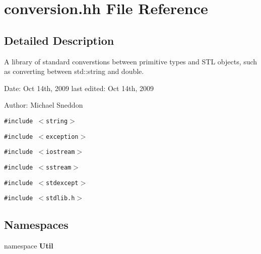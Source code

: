 \section{conversion.hh File Reference}
\label{conversion_8hh}


\subsection{Detailed Description}
A library of standard converstions between primitive types and STL objects, such as converting between std::string and double.

\begin{Desc}
\item[Date:]Oct 14th, 2009 last edited: Oct 14th, 2009\end{Desc}
\begin{Desc}
\item[Author:]Michael Sneddon \end{Desc}


{\tt \#include $<$string$>$}\par
{\tt \#include $<$exception$>$}\par
{\tt \#include $<$iostream$>$}\par
{\tt \#include $<$sstream$>$}\par
{\tt \#include $<$stdexcept$>$}\par
{\tt \#include $<$stdlib.h$>$}\par
\subsection*{Namespaces}
\begin{CompactItemize}
\item 
namespace {\bf Util}
\end{CompactItemize}
